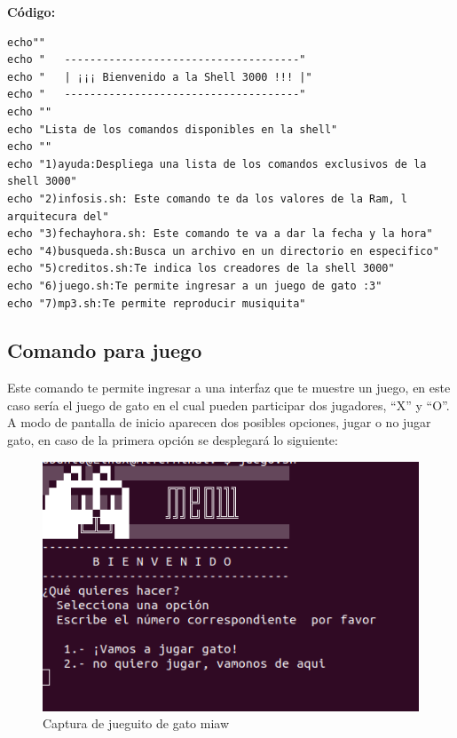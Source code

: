 \documentclass[12pt,a4paper]{article}
\begin{document}
\textbf{Código:}
\begin{lstlisting}[style=BashInputStyle]
echo""
echo "   -------------------------------------"
echo "   | ¡¡¡ Bienvenido a la Shell 3000 !!! |"
echo "   -------------------------------------"
echo ""
echo "Lista de los comandos disponibles en la shell"
echo ""
echo "1)ayuda:Despliega una lista de los comandos exclusivos de la shell 3000"
echo "2)infosis.sh: Este comando te da los valores de la Ram, l arquitecura del"
echo "3)fechayhora.sh: Este comando te va a dar la fecha y la hora"
echo "4)busqueda.sh:Busca un archivo en un directorio en especifico"
echo "5)creditos.sh:Te indica los creadores de la shell 3000"
echo "6)juego.sh:Te permite ingresar a un juego de gato :3"
echo "7)mp3.sh:Te permite reproducir musiquita"
\end{lstlisting}

\newpage
\subsection{Comando para juego}

\noindent Este comando te permite ingresar a una interfaz que te muestre un juego, en este caso sería el juego de gato en el cual pueden participar dos jugadores, “X” y “O”.
A modo de pantalla de inicio aparecen dos posibles opciones, jugar o no jugar gato, en caso de la primera opción se desplegará lo siguiente: 

\begin{figure}[H]
    \centering
    \includegraphics[width=\textwidth]{img/0.png}
    \caption{Captura de jueguito de gato miaw}
    \label{gato1}
\end{figure}
\end{document}

